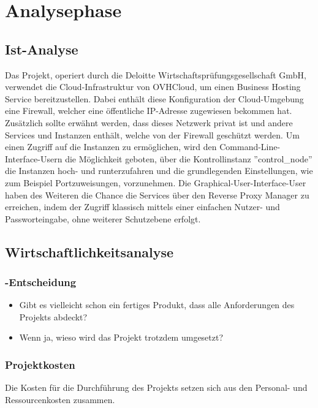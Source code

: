 \section{Analysephase} 
\label{sec:Analysephase}


\subsection{Ist-Analyse} 
\label{sec:IstAnalyse}
Das Projekt, operiert durch die Deloitte Wirtschaftsprüfungsgesellschaft GmbH, verwendet die Cloud-Infrastruktur 
von OVHCloud, um einen Business Hosting Service bereitzustellen. Dabei enthält diese Konfiguration der 
Cloud-Umgebung eine Firewall, welcher eine öffentliche IP-Adresse zugewiesen bekommen hat. Zusätzlich sollte erwähnt werden, 
dass dieses Netzwerk privat ist und andere Services und Instanzen enthält, welche von der Firewall geschützt werden.
Um einen Zugriff auf die Instanzen zu ermöglichen, wird den Command-Line-Interface-Usern die Möglichkeit geboten, 
über die Kontrollinstanz ''control\_node'' die Instanzen hoch- und runterzufahren und die grundlegenden Einstellungen, wie 
zum Beispiel Portzuweisungen, vorzunehmen. Die Graphical-User-Interface-User haben des Weiteren die Chance die Services über 
den Reverse Proxy Manager zu erreichen, indem der Zugriff klassisch mittels einer einfachen Nutzer- und Passworteingabe, 
ohne weiterer Schutzebene erfolgt.



\subsection{Wirtschaftlichkeitsanalyse}
\label{sec:Wirtschaftlichkeitsanalyse}



\subsubsection{-Entscheidung}
\label{sec:MakeOrBuyEntscheidung}
\begin{itemize}
	\item Gibt es vielleicht schon ein fertiges Produkt, dass alle Anforderungen des Projekts abdeckt?
	\item Wenn ja, wieso wird das Projekt trotzdem umgesetzt?
\end{itemize}


\subsubsection{Projektkosten}
\label{sec:Projektkosten}
Die Kosten für die Durchführung des Projekts setzen sich aus den Personal- und Ressourcenkosten zusammen.   

